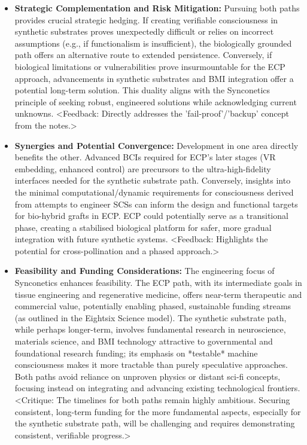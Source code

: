 \documentclass[10pt]{article}
\begin{document}
\begin{sloppypar}
\begin{itemize}
    \item \textbf{Strategic Complementation and Risk Mitigation:} Pursuing both paths provides crucial strategic hedging. If creating verifiable consciousness in synthetic substrates proves unexpectedly difficult or relies on incorrect assumptions (e.g., if functionalism is insufficient), the biologically grounded path offers an alternative route to extended persistence. Conversely, if biological limitations or vulnerabilities prove insurmountable for the ECP approach, advancements in synthetic substrates and BMI integration offer a potential long-term solution. This duality aligns with the Synconetics principle of seeking robust, engineered solutions while acknowledging current unknowns. <Feedback: Directly addresses the 'fail-proof'/'backup' concept from the notes.>

    \item \textbf{Synergies and Potential Convergence:} Development in one area directly benefits the other. Advanced BCIs required for ECP's later stages (VR embedding, enhanced control) are precursors to the ultra-high-fidelity interfaces needed for the synthetic substrate path. Conversely, insights into the minimal computational/dynamic requirements for consciousness derived from attempts to engineer SCSs can inform the design and functional targets for bio-hybrid grafts in ECP. ECP could potentially serve as a transitional phase, creating a stabilised biological platform for safer, more gradual integration with future synthetic systems. <Feedback: Highlights the potential for cross-pollination and a phased approach.>

    \item \textbf{Feasibility and Funding Considerations:} The engineering focus of Synconetics enhances feasibility. The ECP path, with its intermediate goals in tissue engineering and regenerative medicine, offers near-term therapeutic and commercial value, potentially enabling phased, sustainable funding streams (as outlined in the Eightsix Science model). The synthetic substrate path, while perhaps longer-term, involves fundamental research in neuroscience, materials science, and BMI technology attractive to governmental and foundational research funding; its emphasis on *testable* machine consciousness makes it more tractable than purely speculative approaches. Both paths avoid reliance on unproven physics or distant sci-fi concepts, focusing instead on integrating and advancing existing technological frontiers. <Critique: The timelines for both paths remain highly ambitious. Securing consistent, long-term funding for the more fundamental aspects, especially for the synthetic substrate path, will be challenging and requires demonstrating consistent, verifiable progress.>


\end{itemize}
\end{sloppypar}
\end{document}
